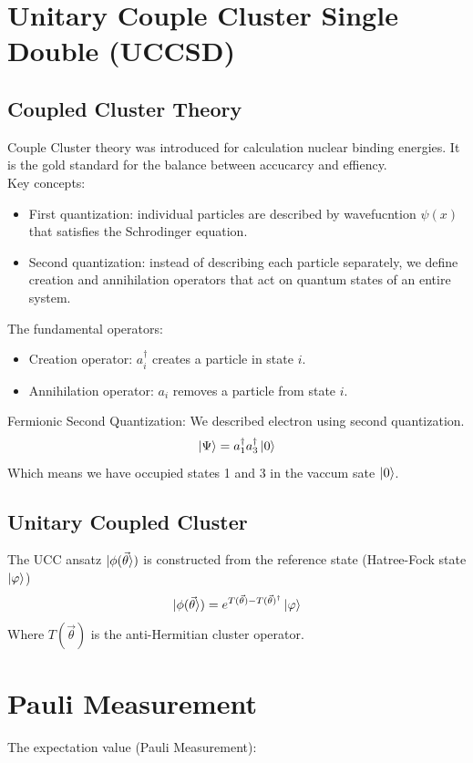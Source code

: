 \documentclass{article}
\begin{document}
\section{Unitary Couple Cluster Single Double (UCCSD)}
\subsection{Coupled Cluster Theory}
Couple Cluster theory was introduced for calculation nuclear binding energies. It is the gold standard for the balance between accucarcy and effiency. \\
Key concepts:
\begin{itemize}
	\item First quantization: individual particles are described by wavefucntion \(\psi(x)\) that satisfies the Schrodinger equation.
	\item Second quantization: instead of describing each particle separately, we define creation and annihilation operators that act on quantum states of an entire system.
\end{itemize}
The fundamental operators:
\begin{itemize}
	\item Creation operator: \(a^\dagger_i\) creates a particle in state \(i\).
	\item Annihilation operator: \(a_i\) removes a particle from state \(i\).
\end{itemize}
Fermionic Second Quantization: We described electron using second quantization.
\[\ket{\Psi} = a^\dagger_1 a^\dagger_3 \ket{0}\]
Which means we have occupied states 1 and 3 in the vaccum sate \(\ket{0}\).\\

\subsection{Unitary Coupled Cluster}
The UCC ansatz \(\ket{\phi(\vec{\theta}})\) is constructed from the reference state (Hatree-Fock state \(\ket{\varphi}\))
\begin{equation}
	\ket{\phi(\vec{\theta}}) = e^{T(\vec{\theta})-T(\vec{\theta})^\dagger}\ket{\varphi}
\end{equation}
Where \(T(\vec{\theta})\) is the anti-Hermitian cluster operator.


\section{Pauli Measurement}
The expectation value (Pauli Measurement):
\hl{}\\
\end{document}
